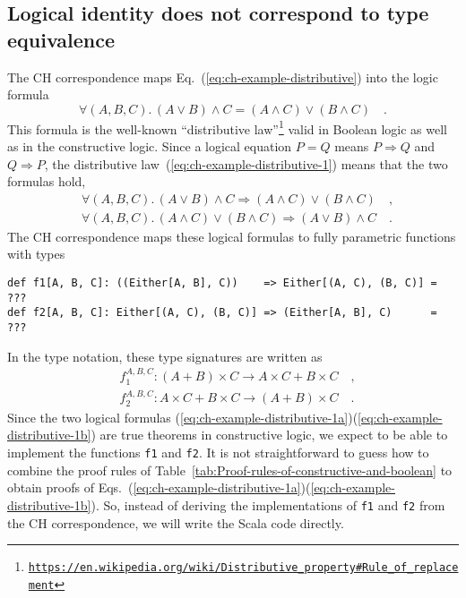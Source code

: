 \subsection{Logical identity does not correspond to type equivalence\label{subsec:Logical-identity-not-type-equivalence}}

The CH correspondence maps Eq.~(\ref{eq:ch-example-distributive})
into the logic formula
\begin{equation}
\forall(A,B,C).\,\left(A\vee B\right)\wedge C=\left(A\wedge C\right)\vee\left(B\wedge C\right)\quad.\label{eq:ch-example-distributive-1}
\end{equation}
This formula is the well-known \textsf{``}distributive law\textsf{''}\footnote{\texttt{\href{https://en.wikipedia.org/wiki/Distributive_property\#Rule_of_replacement}{https://en.wikipedia.org/wiki/Distributive\_property\#Rule\_of\_replacement}}}
valid in Boolean logic as well as in the constructive logic. Since
a logical equation $P=Q$ means $P\Rightarrow Q$ and $Q\Rightarrow P$,
the distributive law~(\ref{eq:ch-example-distributive-1}) means
that the two formulas hold,
\begin{align}
 & \forall(A,B,C).\,\left(A\vee B\right)\wedge C\Rightarrow\left(A\wedge C\right)\vee\left(B\wedge C\right)\quad,\label{eq:ch-example-distributive-1a}\\
 & \forall(A,B,C).\,\left(A\wedge C\right)\vee\left(B\wedge C\right)\Rightarrow\left(A\vee B\right)\wedge C\quad.\label{eq:ch-example-distributive-1b}
\end{align}
The CH correspondence maps these logical formulas to fully parametric
functions with types
\begin{lstlisting}
def f1[A, B, C]: ((Either[A, B], C))    => Either[(A, C), (B, C)] = ???
def f2[A, B, C]: Either[(A, C), (B, C)] => (Either[A, B], C)      = ???
\end{lstlisting}
In the type notation, these type signatures are written as
\begin{align*}
 & f_{1}^{A,B,C}:\left(A+B\right)\times C\rightarrow A\times C+B\times C\quad,\\
 & f_{2}^{A,B,C}:A\times C+B\times C\rightarrow\left(A+B\right)\times C\quad.
\end{align*}
Since the two logical formulas (\ref{eq:ch-example-distributive-1a})\textendash (\ref{eq:ch-example-distributive-1b})
are true theorems in constructive logic, we expect to be able to implement
the functions \lstinline!f1! and \lstinline!f2!. It is not straightforward
to guess how to combine the proof rules of Table~\ref{tab:Proof-rules-of-constructive-and-boolean}
to obtain proofs of Eqs.~(\ref{eq:ch-example-distributive-1a})\textendash (\ref{eq:ch-example-distributive-1b}).
So, instead of deriving the implementations of \lstinline!f1! and
\lstinline!f2! from the CH correspondence, we will write the Scala
code directly.

